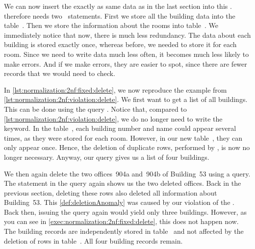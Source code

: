 We can now insert the exactly as same data as in the last section into this \db.
 therefore needs two~ statements.
First we store all the building data into the table~.
Then we store the information about the rooms into table~.
We immediately notice that now, there is much less redundancy.
The data about each building is stored exactly once, whereas before, we needed to store it for each room.
Since we need to write data much less often, it becomes much less likely to make errors.
And if we make errors, they are easier to spot, since there are fewer records that we would need to check.

In \cref{lst:normalization:2nf:fixed:delete}, we now reproduce the example from \cref{lst:normalization:2nf:violation:delete}.
We first want to get a list of all buildings.
This can be done using the query .
Notice that, compared to \cref{lst:normalization:2nf:violation:delete}, we do no longer need to write the  keyword.
In the table~, each building number and name could appear several times, as they were stored for each room.
However, in our new table~, they can only appear once.
Hence, the deletion of duplicate rows, performed by , is now no longer necessary.
Anyway, our query gives us a list of four buildings.

We then again delete the two offices~904a and~904b of Building~53 using a  query.
The  statement in the query again shows us the two deleted offices.
Back in the previous section, deleting these rows also deleted all information about Building~53.
This \cref{def:deletionAnomaly} was caused by our violation of the .
Back then, issuing the  query again would yield only three buildings.
However, as you can see in \cref{exec:normalization:2nf:fixed:delete}, this does not happen now.
The building records are independently stored in table~ and not affected by the deletion of rows in table~.
All four building records remain.

